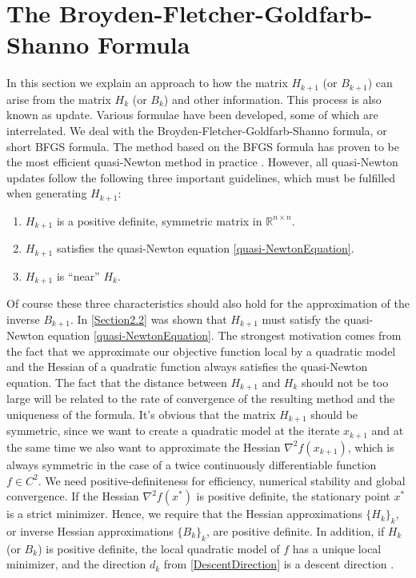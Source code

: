 \section{The Broyden-Fletcher-Goldfarb-Shanno Formula}
\label{Section2.3}

In this section we explain an approach to how the matrix $H_{k+1}$ (or $B_{k+1}$) can arise from the matrix $H_k$ (or $B_k$) and other information. This process is also known as update. Various formulae have been developed, some of which are interrelated. We deal with the Broyden-Fletcher-Goldfarb-Shanno formula, or short BFGS formula. The method based on the BFGS formula has proven to be the most efficient quasi-Newton method in practice \cite[p.~69]{UlbrichUlbrich:2012}. However, all quasi-Newton updates follow the following three important guidelines, which must be fulfilled when generating $H_{k+1}$:
\begin{enumerate}
    \item $H_{k+1}$ is a positive definite, symmetric matrix in $\mathbb{R}^{n \times n}$. 
    \item $H_{k+1}$ satisfies the quasi-Newton equation \cref{quasi-NewtonEquation}.
    \item $H_{k+1}$ is “near” $H_k$.
\end{enumerate}
Of course these three characteristics should also hold for the approximation of the inverse $B_{k+1}$. In \cref{Section2.2} was shown that $H_{k+1}$ must satisfy the quasi-Newton equation \cref{quasi-NewtonEquation}. The strongest motivation comes from the fact that we approximate our objective function local by a quadratic model and the Hessian of a quadratic function always satisfies the quasi-Newton equation. The fact that the distance between $H_{k+1}$ and $H_k$ should not be too large will be related to the rate of convergence of the resulting method and the uniqueness of the formula. It's obvious that the matrix $H_{k+1}$ should be symmetric, since we want to create a quadratic model at the iterate $x_{k+1}$ and at the same time we also want to approximate the Hessian $\nabla^2 f(x_{k+1})$, which is always symmetric in the case of a twice continuously differentiable function $f \in C^2$. We need positive-definiteness for efficiency, numerical stability and global convergence. If the Hessian $\nabla^2 f(x^*)$ is positive definite, the stationary point $x^*$ is a strict minimizer. Hence, we require that the Hessian approximations $\{H_k\}_k$, or inverse Hessian approximations $\{B_k\}_k$, are positive definite. In addition, if $H_k$ (or $B_k$) is positive definite, the local quadratic model of $f$ has a unique local minimizer, and the direction $d_k$ from \cref{DescentDirection} is a descent direction \cite[p.~212]{SunYuan:2006}. \\
